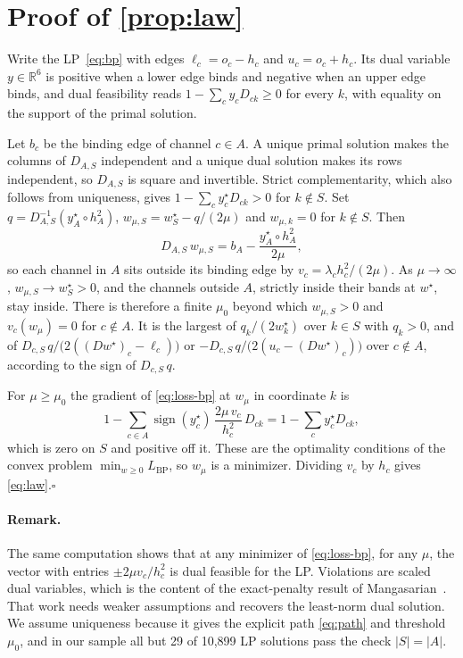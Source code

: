 \clearpage
\appendix
\renewcommand{\thesection}{\Alph{section}}

\section{Proof of \cref{prop:law}}
\label{app:proof}

Write the LP~\eqref{eq:bp} with edges $\ell_c=o_c-h_c$ and $u_c=o_c+h_c$. Its dual variable $y\in\mathbb{R}^6$ is positive when a lower edge binds and negative when an upper edge binds, and dual feasibility reads $1-\sum_c y_c D_{ck}\ge 0$ for every $k$, with equality on the support of the primal solution.

Let $b_c$ be the binding edge of channel $c\in A$. A unique primal solution makes the columns of $D_{A,S}$ independent and a unique dual solution makes its rows independent, so $D_{A,S}$ is square and invertible. Strict complementarity, which also follows from uniqueness, gives $1-\sum_c y^\star_c D_{ck}>0$ for $k\notin S$. Set $q=D_{A,S}^{-1}(y^\star_A\circ h_A^2)$, $w_{\mu,S}=w^\star_S-q/(2\mu)$ and $w_{\mu,k}=0$ for $k\notin S$. Then
\begin{equation}
  D_{A,S}\,w_{\mu,S}=b_A-\frac{y^\star_A\circ h_A^2}{2\mu},
\end{equation}
so each channel in $A$ sits outside its binding edge by $v_c=\lambda_c h_c^2/(2\mu)$. As $\mu\to\infty$, $w_{\mu,S}\to w^\star_S>0$, and the channels outside $A$, strictly inside their bands at $w^\star$, stay inside. There is therefore a finite $\mu_0$ beyond which $w_{\mu,S}>0$ and $v_c(w_\mu)=0$ for $c\notin A$. It is the largest of $q_k/(2w^\star_k)$ over $k\in S$ with $q_k>0$, and of $D_{c,S}\,q/\bigl(2((Dw^\star)_c-\ell_c)\bigr)$ or $-D_{c,S}\,q/\bigl(2(u_c-(Dw^\star)_c)\bigr)$ over $c\notin A$, according to the sign of $D_{c,S}\,q$.

For $\mu\ge\mu_0$ the gradient of \cref{eq:loss-bp} at $w_\mu$ in coordinate $k$ is
\begin{equation}
  1-\sum_{c\in A}\operatorname{sign}(y^\star_c)\,\frac{2\mu\,v_c}{h_c^2}\,D_{ck}
  =1-\sum_{c}y^\star_c D_{ck},
\end{equation}
which is zero on $S$ and positive off it. These are the optimality conditions of the convex problem $\min_{w\ge0}L_{\mathrm{BP}}$, so $w_\mu$ is a minimizer. Dividing $v_c$ by $h_c$ gives \cref{eq:law}.\hfill$\square$

\paragraph{Remark.}
The same computation shows that at any minimizer of \cref{eq:loss-bp}, for any $\mu$, the vector with entries $\pm 2\mu v_c/h_c^2$ is dual feasible for the LP. Violations are scaled dual variables, which is the content of the exact-penalty result of Mangasarian~\cite{mangasarian2004newton}. That work needs weaker assumptions and recovers the least-norm dual solution. We assume uniqueness because it gives the explicit path \eqref{eq:path} and threshold $\mu_0$, and in our sample all but 29 of 10,899 LP solutions pass the check $|S|=|A|$.


